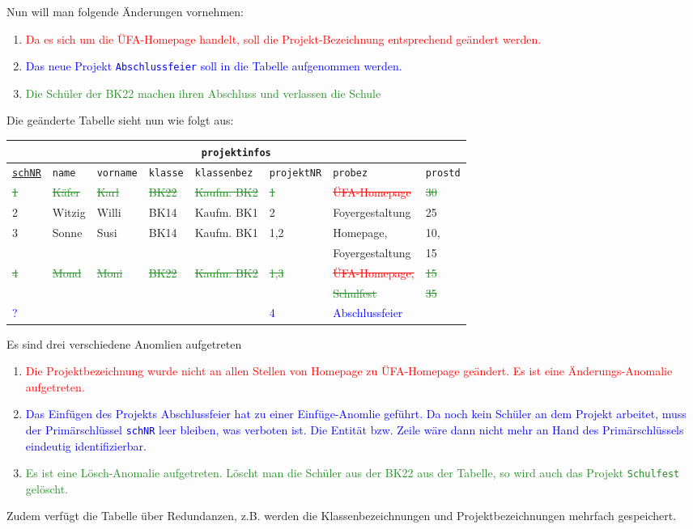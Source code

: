 Nun will man folgende Änderungen vornehmen:
\begin{enumerate}
	\item \textcolor{red}{Da es sich um die ÜFA-Homepage handelt, soll die Projekt-Bezeichnung entsprechend geändert werden.}
	\item \textcolor{blue}{Das neue Projekt \texttt{Abschlussfeier} soll in die Tabelle aufgenommen werden.}
	\item \textcolor{ForestGreen}{Die Schüler der BK22 machen ihren Abschluss und verlassen die Schule}
\end{enumerate}
Die geänderte Tabelle sieht nun wie folgt aus:
\begin{tabular}{llllllll}
	\multicolumn{8}{c}{\lstinline!projektinfos!}\\
	\hline
	\underline{\lstinline!schNR!}&\lstinline!name!&\lstinline!vorname!&\lstinline!klasse!&\lstinline!klassenbez!&\lstinline!projektNR!&\lstinline!probez!&\lstinline!prostd!\\
	\hline
	\textcolor{ForestGreen}{\sout{1}} &
	\textcolor{ForestGreen}{\sout{Käfer}} &
	\textcolor{ForestGreen}{\sout{Karl}} &
	\textcolor{ForestGreen}{\sout{BK22}} &
	\textcolor{ForestGreen}{\sout{Kaufm. BK2}}&
	\textcolor{ForestGreen}{\sout{1}} &
	\textcolor{red}{\sout{ÜFA-Homepage}} &
	\textcolor{ForestGreen}{\sout{30}} \\
	2 &
	Witzig  &
	Willi &
	BK14 &
	Kaufm. BK1&
	2 &
	Foyergestaltung &
	25 \\
	3 &
	Sonne &
	Susi &
	BK14 &
	Kaufm. BK1&
	1,2 &
	Homepage,&
	10,\\
	&&&&&&Foyergestaltung&15\\
	\textcolor{ForestGreen}{\sout{4}}&
	\textcolor{ForestGreen}{\sout{Mond}}&
	\textcolor{ForestGreen}{\sout{Moni}}&
	\textcolor{ForestGreen}{\sout{BK22}}&
	\textcolor{ForestGreen}{\sout{Kaufm. BK2}}&
	\textcolor{ForestGreen}{\sout{1,3}}&
	\textcolor{red}{\sout{ÜFA-Homepage,}}&
	\textcolor{ForestGreen}{\sout{15}}\\
	&&&&&&\textcolor{ForestGreen}{\sout{Schulfest}}&\textcolor{ForestGreen}{\sout{35}}\\
	\textcolor{blue}{?}&
	&
	&
	&
	&
	\textcolor{blue}{4} &
	\textcolor{blue}{Abschlussfeier}&
	\\
\end{tabular}\newpage
Es sind drei verschiedene Anomlien aufgetreten
\begin{enumerate}
	\item \textcolor{red}{Die Projektbezeichnung wurde nicht an allen Stellen von Homepage zu ÜFA-Homepage geändert. Es ist eine Änderungs-Anomalie aufgetreten.}
	\item \textcolor{blue}{Das Einfügen des Projekts Abschlussfeier hat zu einer Einfüge-Anomlie geführt. Da noch kein Schüler an dem Projekt arbeitet, muss der Primärschlüssel \lstinline!schNR! leer bleiben, was verboten ist. Die Entität bzw. Zeile wäre dann nicht mehr an Hand des Primärschlüssels eindeutig identifizierbar.}
	\item \textcolor{ForestGreen}{Es ist eine Lösch-Anomalie aufgetreten. Löscht man die Schüler aus der BK22 aus der Tabelle, so wird auch das Projekt \texttt{Schulfest} gelöscht.}
\end{enumerate}
Zudem verfügt die Tabelle über Redundanzen, z.B. werden die Klassenbezeichnungen und Projektbezeichnungen mehrfach gespeichert.